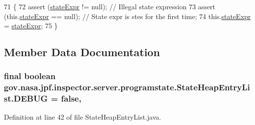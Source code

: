 \begin{DoxyCode}
71                                                  \{
72     assert (\hyperlink{classgov_1_1nasa_1_1jpf_1_1inspector_1_1server_1_1programstate_1_1_state_node_a784a38d8edeb54f871891cb63de85585}{stateExpr} != null); \textcolor{comment}{// Illegal state expression}
73     assert (this.\hyperlink{classgov_1_1nasa_1_1jpf_1_1inspector_1_1server_1_1programstate_1_1_state_node_a784a38d8edeb54f871891cb63de85585}{stateExpr} == null); \textcolor{comment}{// State expr is stes for the first time;}
74     this.\hyperlink{classgov_1_1nasa_1_1jpf_1_1inspector_1_1server_1_1programstate_1_1_state_node_a784a38d8edeb54f871891cb63de85585}{stateExpr} = \hyperlink{classgov_1_1nasa_1_1jpf_1_1inspector_1_1server_1_1programstate_1_1_state_node_a784a38d8edeb54f871891cb63de85585}{stateExpr};
75   \}
\end{DoxyCode}


\subsection{Member Data Documentation}
\subsubsection[{\texorpdfstring{D\+E\+B\+UG}{DEBUG}}]{\setlength{\rightskip}{0pt plus 5cm}final boolean gov.\+nasa.\+jpf.\+inspector.\+server.\+programstate.\+State\+Heap\+Entry\+List.\+D\+E\+B\+UG = false\hspace{0.3cm}{\ttfamily [static]}, {\ttfamily [private]}}\hypertarget{classgov_1_1nasa_1_1jpf_1_1inspector_1_1server_1_1programstate_1_1_state_heap_entry_list_a3880b67f48282ea20d19ffa19491ec35}{}\label{classgov_1_1nasa_1_1jpf_1_1inspector_1_1server_1_1programstate_1_1_state_heap_entry_list_a3880b67f48282ea20d19ffa19491ec35}


Definition at line 42 of file State\+Heap\+Entry\+List.\+java.

